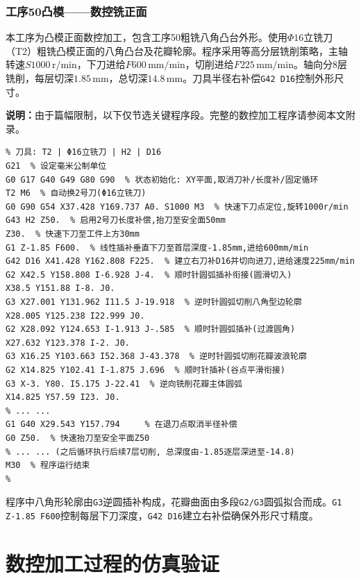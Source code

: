 \documentclass{xautCADreport}
\begin{document}
\subsubsection{工序50凸模——数控铣正面}

本工序为凸模正面数控加工，包含工序50粗铣八角凸台外形。使用$\Phi16$立铣刀（T2）粗铣凸模正面的八角凸台及花瓣轮廓。程序采用等高分层铣削策略，主轴转速$S1000\,\mathrm{r/min}$，下刀进给$F600\,\mathrm{mm/min}$，切削进给$F225\,\mathrm{mm/min}$。轴向分8层铣削，每层切深$1.85\,\mathrm{mm}$，总切深$14.8\,\mathrm{mm}$。刀具半径右补偿\texttt{G42 D16}控制外形尺寸。

\noindent\textbf{说明：}由于篇幅限制，以下仅节选关键程序段。完整的数控加工程序请参阅本文附录。

\begin{lstlisting}[language={},caption={工序50凸模粗铣正面程序（节选）}]
% 程序名: 工序50-凸模 (粗铣正面八角外形)
% 刀具: T2 | Φ16立铣刀 | H2 | D16
G21  % 设定毫米公制单位
G0 G17 G40 G49 G80 G90  % 状态初始化: XY平面,取消刀补/长度补/固定循环
T2 M6  % 自动换2号刀(Φ16立铣刀)
G0 G90 G54 X37.428 Y169.737 A0. S1000 M3  % 快速下刀点定位,旋转1000r/min
G43 H2 Z50.  % 启用2号刀长度补偿,抬刀至安全面50mm
Z30.  % 快速下刀至工件上方30mm
G1 Z-1.85 F600.  % 线性插补垂直下刀至首层深度-1.85mm,进给600mm/min
G42 D16 X41.428 Y162.808 F225.  % 建立右刀补D16并切向进刀,进给速度225mm/min
G2 X42.5 Y158.808 I-6.928 J-4.  % 顺时针圆弧插补衔接(圆滑切入)
X38.5 Y151.88 I-8. J0.
G3 X27.001 Y131.962 I11.5 J-19.918  % 逆时针圆弧切削八角型边轮廓
X28.005 Y125.238 I22.999 J0.
G2 X28.092 Y124.653 I-1.913 J-.585  % 顺时针圆弧插补(过渡圆角)
X27.632 Y123.378 I-2. J0.
G3 X16.25 Y103.663 I52.368 J-43.378  % 逆时针圆弧切削花瓣波浪轮廓
G2 X14.825 Y102.41 I-1.875 J.696  % 顺时针插补(谷点平滑衔接)
G3 X-3. Y80. I5.175 J-22.41  % 逆向铣削花瓣主体圆弧
X14.825 Y57.59 I23. J0.
% ... ...
G1 G40 X29.543 Y157.794     % 在退刀点取消半径补偿
G0 Z50.  % 快速抬刀至安全平面Z50
% ... ... (之后循环执行后续7层切削, 总深度由-1.85逐层深进至-14.8)
M30  % 程序运行结束
%
\end{lstlisting}

程序中八角形轮廓由\texttt{G3}逆圆插补构成，花瓣曲面由多段\texttt{G2/G3}圆弧拟合而成。\texttt{G1 Z-1.85 F600}控制每层下刀深度，\texttt{G42 D16}建立右补偿确保外形尺寸精度。


\newpage

\section{数控加工过程的仿真验证}
\end{document}
